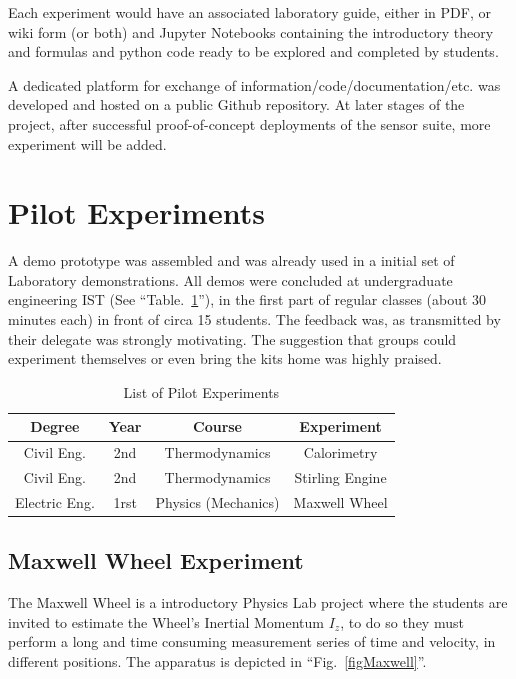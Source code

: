 \documentclass[conference]{IEEEtran}
\begin{document}
Each experiment would have an associated laboratory guide, either in PDF, or wiki form (or both) and Jupyter Notebooks containing 
the introductory theory and formulas and python code ready to be explored and completed by students. 

A dedicated platform for exchange of information/code/documentation/etc. was developed and hosted on a public Github\cite{gh} repository. 
At later stages of the project, after successful proof-of-concept deployments of the sensor suite, more experiment will be added.


\section{Pilot Experiments}
A demo prototype was assembled and was already used in a initial set of Laboratory demonstrations. 
All demos were concluded at undergraduate engineering IST (See ``Table.~\ref{tab1}''), 
in the first part of regular classes (about 30 minutes each) in front of circa 15 students.
The feedback was, as transmitted by their delegate was strongly motivating. The suggestion that groups could experiment themselves 
or even bring the kits home was highly praised.

\begin{table}[htbp]
\caption{List of Pilot Experiments}
\begin{center}
\begin{tabular}{|c|c|c|c|}
\hline
\textbf{Degree}&\textbf{Year}&\textbf{Course} &\textbf{Experiment}\\
\hline
Civil Eng. & 2nd&  Thermodynamics & Calorimetry\\
\hline
Civil Eng. & 2nd&  Thermodynamics & Stirling Engine\\
\hline
 Electric Eng.& 1rst&  Physics (Mechanics) & Maxwell Wheel\\
\hline
\end{tabular}
\label{tab1}
\end{center}
\end{table}

\subsection{Maxwell Wheel Experiment}
The Maxwell Wheel is a introductory Physics Lab project\cite{b5,b6} where the students are 
invited to estimate the Wheel's Inertial Momentum  $I_z$,
to do so they must perform a long and time consuming measurement series of time and velocity, 
in different positions. 
The apparatus is depicted in ``Fig.~\ref{figMaxwell}''.
\end{document}
